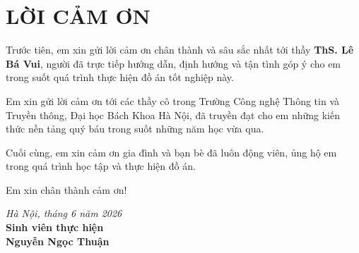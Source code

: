 \documentclass[../main.tex]{subfiles}
\begin{document}
\chapter*{LỜI CẢM ƠN}
\thispagestyle{plain}

Trước tiên, em xin gửi lời cảm ơn chân thành và sâu sắc nhất tới thầy \textbf{ThS. Lê Bá Vui}, người đã trực tiếp hướng dẫn, định hướng và tận tình góp ý cho em trong suốt quá trình thực hiện đồ án tốt nghiệp này.

Em xin gửi lời cảm ơn tới các thầy cô trong Trường Công nghệ Thông tin và Truyền thông, Đại học Bách Khoa Hà Nội, đã truyền đạt cho em những kiến thức nền tảng quý báu trong suốt những năm học vừa qua.

Cuối cùng, em xin cảm ơn gia đình và bạn bè đã luôn động viên, ủng hộ em trong quá trình học tập và thực hiện đồ án.

Em xin chân thành cảm ơn!

\vspace{1.5em}
\begin{flushright}
\textit{Hà Nội, tháng 6 năm 2026}\\[0.5em]
\textbf{Sinh viên thực hiện}\\[2.5em]
\textbf{Nguyễn Ngọc Thuận}
\end{flushright}
\end{document}
